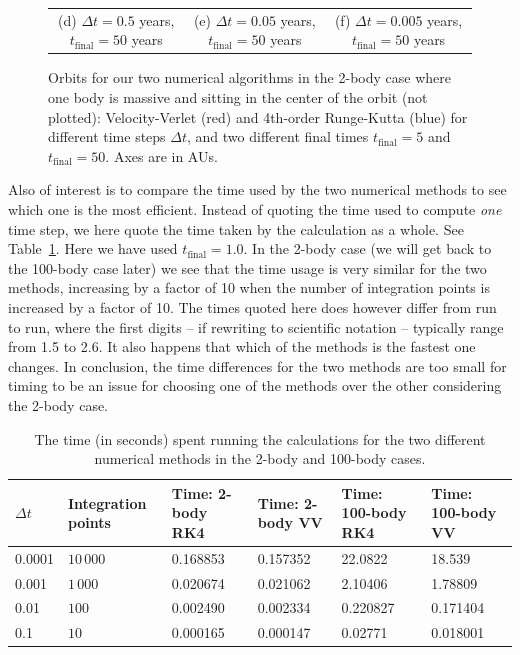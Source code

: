 \documentclass{article}
\begin{document}
\begin{multicols}{2}
\begin{figure}
\begin{center}
\begin{tabular}{ccc}
	(d) $\Delta t = 0.5$ years, $t_{\mathrm{final}} = 50$ years		&(e) $\Delta t = 0.05$ years, $t_{\mathrm{final}} = 50$ years 	& (f) $\Delta t = 0.005$ years, $t_{\mathrm{final}} = 50$ years  \\[6pt]
\end{tabular}
\caption{Orbits for our two numerical algorithms in the 2-body case where one body is massive and sitting in the center of the orbit (not plotted): Velocity-Verlet (red) and 4th-order Runge-Kutta (blue) for different time steps $\Delta t$, and two different final times $t_{\mathrm{final}} = 5$ and $t_{\mathrm{final}} = 50$. Axes are in AUs.}\label{fig:2_body}
\end{center}
\end{figure}
Also of interest is to compare the time used by the two numerical methods to see which one is the most efficient. Instead of quoting the time used to compute \textit{one} time step, we here quote the time taken by the calculation as a whole. See Table~\ref{table:times}. Here we have used $t_{\mathrm{final}} = 1.0$. In the 2-body case (we will get back to the 100-body case later) we see that the time usage is very similar for the two methods, increasing by a factor of 10 when the number of integration points is increased by a factor of 10. The times quoted here does however differ from run to run, where the first digits -- if rewriting to scientific notation -- typically range from 1.5 to 2.6. It also happens that which of the methods is the fastest one changes. In conclusion, the time differences for the two methods are too small for timing to be an issue for choosing one of the methods over the other considering the 2-body case.

\begin{table}
\begin{center}
\begin{tabular}{ l l l l l l}\hline
	$\Delta t$ 				& Integration points	 	& Time: 2-body RK4			& Time: 2-body VV			& Time: 100-body RK4 		& Time: 100-body VV	\\ \hline
	0.0001 				& $10\,000$ 			& 0.168853				& 0.157352				& 22.0822					& 18.539		 \\
	0.001 				& $1\,000$ 			& 0.020674				& 0.021062				& 2.10406					& 1.78809		 \\
	0.01 					& $100$ 				& 0.002490				& 0.002334				& 0.220827				& 0.171404	 \\
	0.1 					& $10$				& 0.000165				& 0.000147				& 0.02771					& 0.018001		 \\
	\hline
\end{tabular}
\caption{The time (in seconds) spent running the calculations for the two different numerical methods in the 2-body and 100-body cases.}\label{table:times}
\end{center}
\end{table}


\end{multicols}
\end{document}

